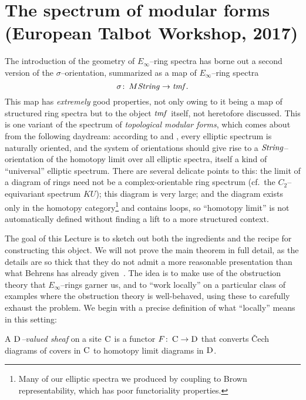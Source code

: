 \section[The spectrum of modular forms]{The spectrum of modular forms \\ (European Talbot Workshop, 2017)}\label{ConstructionOfTMFSection}

The introduction of the geometry of \(E_\infty\)--ring spectra has borne out a second version of the \(\sigma\)--orientation, summarized as a map of \(E_\infty\)--ring spectra \[\sigma\colon\thinspace M\mathit{String} \to \mathit{tmf}.\]  This map has \emph{extremely} good properties, not only owing to it being a map of structured ring spectra but to the object \(\mathit{tmf}\) itself, not heretofore discussed.  This is one variant of the spectrum of \textit{topological modular forms}, which comes about from the following daydream: according to  and , every elliptic spectrum is naturally oriented, and the system of orientations should give rise to a \(\mathit{String}\)--orientation of the homotopy limit over all elliptic spectra, itself a kind of ``universal'' elliptic spectrum.  There are several delicate points to this: the limit of a diagram of rings need not be a complex-orientable ring spectrum (cf.\ the \(C_2\)--equivariant spectrum \(KU\)); this diagram is very large; and the diagram exists only in the homotopy category\footnote{Many of our elliptic spectra we produced by coupling  to Brown representability, which has poor functoriality properties.} and contains loops, so ``homotopy limit'' is not automatically defined without finding a lift to a more structured context.

The goal of this Lecture is to sketch out both the ingredients and the recipe for constructing this object.  We will not prove the main theorem in full detail, as the details are so thick that they do not admit a more reasonable presentation than what Behrens has already given~\cite{BehrensConstruction}.  The idea is to make use of the obstruction theory that \(E_\infty\)--rings garner us, and to ``work locally'' on a particular class of examples where the obstruction theory is well-behaved, using these to carefully exhaust the problem.  We begin with a precise definition of what ``locally'' means in this setting:

\begin{definition}
A \textit{\(\normalfont\textsc{D}\)--valued sheaf} on a site \(\normalfont\textsc{C}\) is a functor \(F\colon\thinspace \normalfont\textsc{C} \to \normalfont\textsc{D}\) that converts \v{C}ech diagrams of covers in \(\normalfont\textsc{C}\) to homotopy limit diagrams in \(\normalfont\textsc{D}\).
\end{definition}

